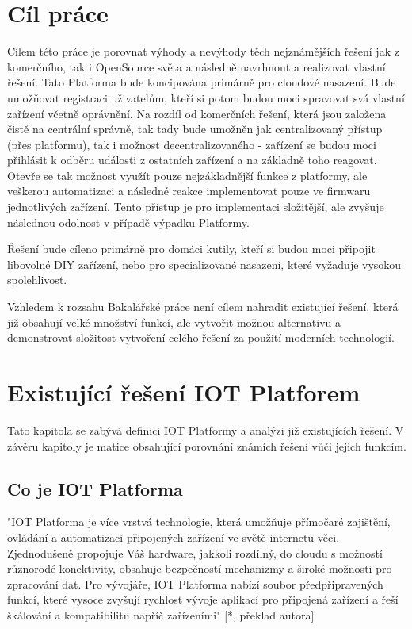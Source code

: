 \documentclass[thesis=B,czech]{FITthesis}[2019/12/23]
\begin{document}
\chapter{Cíl práce}
    Cílem této práce je porovnat výhody a nevýhody těch nejznámějších řešení jak z komerčního, tak i OpenSource světa a následně navrhnout a realizovat vlastní řešení. Tato Platforma bude koncipována primárně pro cloudové nasazení. Bude umožňovat registraci uživatelům, kteří si potom budou moci spravovat svá vlastní zařízení včetně oprávnění. Na rozdíl od komerčních řešení, která jsou založena čistě na centrální správně, tak tady bude umožněn jak centralizovaný přístup (přes platformu), tak i možnost decentralizovaného - zařízení se budou moci přihlásit k odběru události z ostatních zařízení a na základně toho reagovat. Otevře se tak možnost využít pouze nejzákladnější funkce z platformy, ale veškerou automatizaci a následné reakce implementovat pouze ve firmwaru jednotlivých zařízení. Tento přístup je pro implementaci složitější, ale zvyšuje následnou odolnost v případě výpadku Platformy.

    Řešení bude cíleno primárně pro domáci kutily, kteří si budou moci připojit libovolné DIY zařízení, nebo pro specializované nasazení, které vyžaduje vysokou spolehlivost.

    Vzhledem k rozsahu Bakalářské práce není cílem nahradit existující řešení, která již obsahují velké množství funkcí, ale vytvořit možnou alternativu a demonstrovat složitost vytvoření celého řešení za použití moderních technologií. 

    

\chapter{Existující řešení IOT Platforem}
Tato kapitola se zabývá definici IOT Platformy a analýzi již existujících řešení. V závěru kapitoly je matice obsahující porovnání známích řešení vůči jejich funkcím.

\section{Co je IOT Platforma}
    "IOT Platforma je více vrstvá technologie, která umožňuje přímočaré zajištění, ovládání a automatizaci připojených zařízení ve světě internetu věci. Zjednodušeně propojuje Váš hardware, jakkoli rozdílný, do cloudu s možností různorodé konektivity, obsahuje bezpečností mechanizmy a široké možnosti pro zpracování dat. Pro vývojáře, IOT Platforma nabízí soubor předpřipravených funkcí, které vysoce zvyšují rychlost vývoje aplikací pro připojená zařízení a řeší škálování a kompatibilitu napříč zařízeními" [*, překlad autora] %
\end{document}
